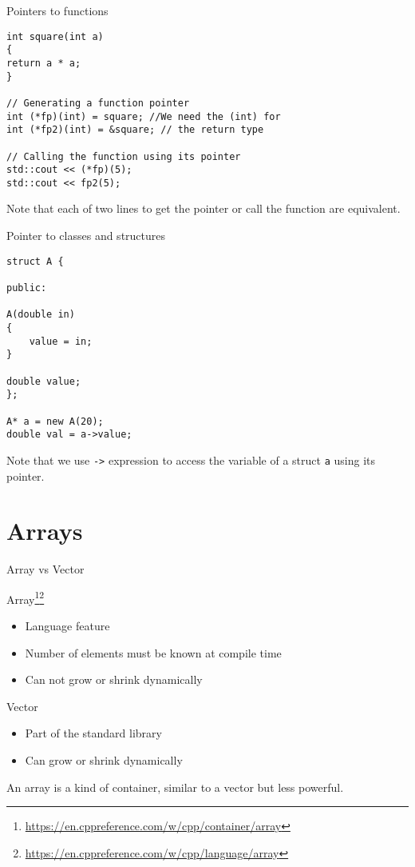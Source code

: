 \documentclass[\classoption]{beamer}
\begin{document}
\begin{frame}[fragile]{Pointers to functions}

\begin{lstlisting}
int square(int a)
{
return a * a;
}

// Generating a function pointer
int (*fp)(int) = square; //We need the (int) for
int (*fp2)(int) = &square; // the return type

// Calling the function using its pointer
std::cout << (*fp)(5);
std::cout << fp2(5);

\end{lstlisting}
Note that each of two lines to get the pointer or call the function are equivalent. 

\end{frame}


\begin{frame}[fragile]{Pointer to classes and structures}

\begin{lstlisting}
struct A {

public: 

A(double in)
{
	value = in;
}

double value;
};

A* a = new A(20);
double val = a->value;
\end{lstlisting}

Note that we use \lstinline|->| expression to access the variable of a struct \lstinline|a|
using its pointer.


\end{frame}

\section{Arrays}

\begin{frame}{Array vs Vector}


\begin{block}{Array\footnote{\tiny\url{https://en.cppreference.com/w/cpp/container/array}}\footnote{\tiny\url{https://en.cppreference.com/w/cpp/language/array}}}
\begin{itemize}
\item Language feature
\item Number of elements must be known at compile time
\item Can not grow or shrink dynamically
\end{itemize}
\end{block}

\begin{block}{Vector}
\begin{itemize}
\item Part of the standard library
\item Can grow or shrink dynamically
\end{itemize}
\end{block}
An array is a kind of container, similar to a vector but less powerful.
\end{frame}
\end{document}
